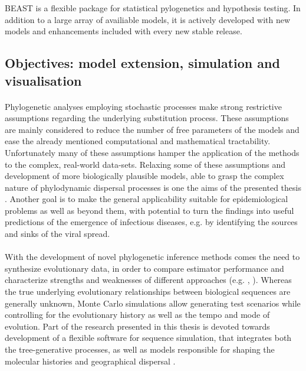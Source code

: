 BEAST is a flexible package for statistical pylogenetics and hypothesis testing.
In addition to a large array of availiable models, it is actively developed with new models and enhancements included with every new stable release.

\subsection{Objectives: model extension, simulation and visualisation}

\paragraph{}
Phylogenetic analyses employing stochastic processes make strong restrictive assumptions regarding the underlying substitution process.
These assumptions are mainly considered to reduce the number of free parameters of the models and ease the already mentioned computational and mathematical tractability.
Unfortunately many of these assumptions hamper the application of the methods to the complex, real-world data-sets.
Relaxing some of these assumptions and development of more biologically plausible models, able to grasp the complex nature of phylodynamic dispersal processes is one the aims of the presented thesis \citep{Bielejec2014a}.
Another goal is to make the general applicability suitable for epidemiological problems as well as beyond them, with potential to turn the findings into useful predictions of the emergence of infectious diseases, e.g. by identifying the sources and sinks of the viral spread.

\paragraph{}
With the development of novel phylogenetic inference methods comes the need to synthesize evolutionary data, in order to compare estimator performance and characterize strengths and weaknesses of different approaches (e.g. \cite{Arenas2012}, \cite{Hoban2011}).
Whereas the true underlying evolutionary relationships between biological sequences are generally unknown, Monte Carlo simulations allow generating test scenarios while controlling for the evolutionary history as well as the tempo and mode of evolution. 
Part of the research presented in this thesis is devoted towards development of a flexible software for sequence simulation, that integrates both the tree-generative processes, as well as models responsible for shaping the molecular histories and geographical dispersal \citep{Bielejec2014a}.

